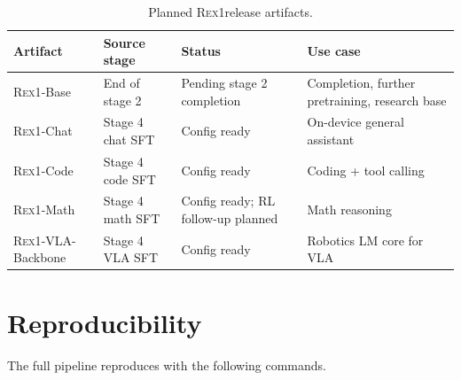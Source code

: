 \documentclass[11pt,a4paper]{article}
\newcommand{\REX}{\textsc{Rex1}\xspace}
\providecommand{\xspace}{}
\begin{document}
\begin{table}[h]
  \centering
  \caption{Planned \REX release artifacts.}
  \label{tab:family}
  \footnotesize
  \begin{tabular}{lllp{5.5cm}}
    \toprule
    Artifact & Source stage & Status & Use case \\
    \midrule
    \REX-Base & End of stage 2 & Pending stage 2 completion & Completion, further pretraining, research base \\
    \REX-Chat & Stage 4 chat SFT & Config ready & On-device general assistant \\
    \REX-Code & Stage 4 code SFT & Config ready & Coding + tool calling \\
    \REX-Math & Stage 4 math SFT & Config ready; RL follow-up planned & Math reasoning \\
    \REX-VLA-Backbone & Stage 4 VLA SFT & Config ready & Robotics LM core for VLA \\
    \bottomrule
  \end{tabular}
\end{table}

\section{Reproducibility}

The full pipeline reproduces with the following commands.
\end{document}
